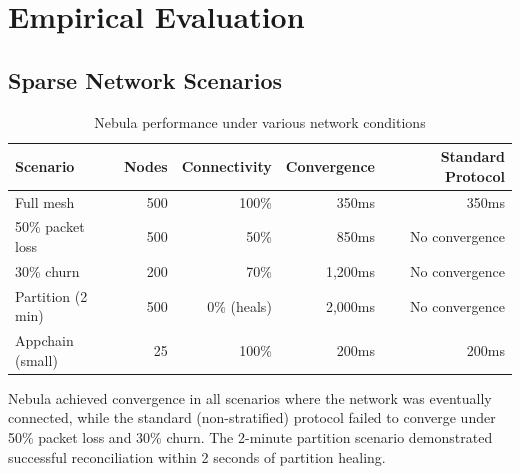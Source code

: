 \section{Empirical Evaluation}

\label{sec:nebula-evaluation}

\subsection{Sparse Network Scenarios}

\begin{table}[h]
\centering
\begin{tabular}{@{}lrrrr@{}}
\toprule
\textbf{Scenario} & \textbf{Nodes} & \textbf{Connectivity} & \textbf{Convergence} & \textbf{Standard Protocol} \\
\midrule
Full mesh & 500 & 100\% & 350ms & 350ms \\
50\% packet loss & 500 & 50\% & 850ms & No convergence \\
30\% churn & 200 & 70\% & 1,200ms & No convergence \\
Partition (2 min) & 500 & 0\% (heals) & 2,000ms & No convergence \\
Appchain (small) & 25 & 100\% & 200ms & 200ms \\
\bottomrule
\end{tabular}
\caption{Nebula performance under various network conditions}
\label{tab:nebula-nebula-results}
\end{table}

Nebula achieved convergence in all scenarios where the network was eventually connected,
while the standard (non-stratified) protocol failed to converge under 50\% packet loss
and 30\% churn. The 2-minute partition scenario demonstrated successful reconciliation
within 2 seconds of partition healing.


